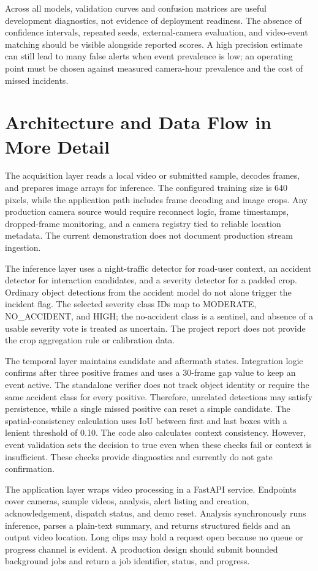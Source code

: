 \documentclass[12pt,a4paper]{article}
\begin{document}
Across all models, validation curves and confusion matrices are useful development diagnostics, not evidence of deployment readiness. The absence of confidence intervals, repeated seeds, external-camera evaluation, and video-event matching should be visible alongside reported scores. A high precision estimate can still lead to many false alerts when event prevalence is low; an operating point must be chosen against measured camera-hour prevalence and the cost of missed incidents.

\section{Architecture and Data Flow in More Detail}
The acquisition layer reads a local video or submitted sample, decodes frames, and prepares image arrays for inference. The configured training size is 640 pixels, while the application path includes frame decoding and image crops. Any production camera source would require reconnect logic, frame timestamps, dropped-frame monitoring, and a camera registry tied to reliable location metadata. The current demonstration does not document production stream ingestion.

The inference layer uses a night-traffic detector for road-user context, an accident detector for interaction candidates, and a severity detector for a padded crop. Ordinary object detections from the accident model do not alone trigger the incident flag. The selected severity class IDs map to MODERATE, NO\_ACCIDENT, and HIGH; the no-accident class is a sentinel, and absence of a usable severity vote is treated as uncertain. The project report does not provide the crop aggregation rule or calibration data.

The temporal layer maintains candidate and aftermath states. Integration logic confirms after three positive frames and uses a 30-frame gap value to keep an event active. The standalone verifier does not track object identity or require the same accident class for every positive. Therefore, unrelated detections may satisfy persistence, while a single missed positive can reset a simple candidate. The spatial-consistency calculation uses IoU between first and last boxes with a lenient threshold of 0.10. The code also calculates context consistency. However, event validation sets the decision to true even when these checks fail or context is insufficient. These checks provide diagnostics and currently do not gate confirmation.

The application layer wraps video processing in a FastAPI service. Endpoints cover cameras, sample videos, analysis, alert listing and creation, acknowledgement, dispatch status, and demo reset. Analysis synchronously runs inference, parses a plain-text summary, and returns structured fields and an output video location. Long clips may hold a request open because no queue or progress channel is evident. A production design should submit bounded background jobs and return a job identifier, status, and progress.
\end{document}
